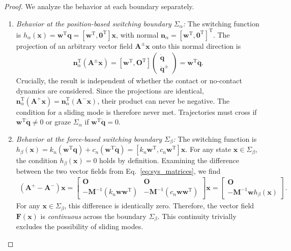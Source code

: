 \documentclass[10pt,a4paper]{amsart}
\newcommand{\T}{^{\mathrm{T}}}
\newcommand{\vA}{\mathbf A}
\newcommand{\vF}{\mathbf F}
\newcommand{\vM}{\mathbf M}
\newcommand{\vO}{\mathbf O}
\newcommand{\vn}{\mathbf n}
\newcommand{\vq}{\mathbf q}
\newcommand{\vw}{\mathbf w}
\newcommand{\vx}{\mathbf x}
\begin{document}
\begin{proof}
	We analyze the behavior at each boundary separately.
	\begin{enumerate}
		\item \textit{Behavior at the position-based switching boundary $\Sigma_{\alpha}$:} The switching function is $h_{\alpha}(\vx) = \vw\T\vq = [ \vw\T, \bm{0}\T ]\vx$, with normal $\vn_{\alpha} = [ \vw\T, \bm{0}\T]\T$. The projection of an arbitrary vector field $\vA^{\pm}\vx$ onto this normal direction is
		\begin{align}
			\vn_{\alpha}\T (\vA^{\pm}\vx) = [ \vw\T, \vO\T] \begin{pmatrix} \dot{\vq} \\ \ddot{\vq}^{\pm} \end{pmatrix} =  \vw\T\dot{\vq}.
		\end{align}
		Crucially, the result is independent of whether the contact or no-contact dynamics are considered. Since the projections are identical, $\vn_{\alpha}\T (\vA^+\vx) = \vn_{\alpha}\T (\vA^-\vx)$, their product can never be negative. The condition for a sliding mode is therefore never met. Trajectories must cross if $ \vw\T \dot{\vq} \neq 0$ or graze $\Sigma_{\alpha}$ if $ \vw\T \dot{\vq} = 0$.
		
		\item \textit{Behavior at the force-based switching boundary $\Sigma_{\beta}$:} The switching function is $h_{\beta}(\vx) = k_n(\vw\T\vq) + c_n(\vw\T\dot{\vq}) = [ k_n\vw\T,  c_n\vw\T]\vx$. For any state $\vx \in \Sigma_{\beta}$, the condition $h_{\beta}(\vx) = 0$ holds by definition. Examining the difference between the two vector fields from Eq.~\eqref{eq:sys_matrices}, we find
		\begin{align}
			(\vA^+ - \vA^-)\vx = \begin{bmatrix} \vO & \vO \\ -\vM^{-1}(k_n\vw\vw\T) & -\vM^{-1}(c_n\vw\vw\T) \end{bmatrix} \vx = \begin{bmatrix} \vO \\ - \vM^{-1}\vw h_{\beta}(\vx) \end{bmatrix}.
		\end{align}
		For any $\vx \in \Sigma_{\beta}$, this difference is identically zero. Therefore, the vector field $\vF(\vx)$ is \textit{continuous} across the boundary $\Sigma_{\beta}$. This continuity trivially excludes the possibility of sliding modes.
	\end{enumerate}
\end{proof}
\end{document}
